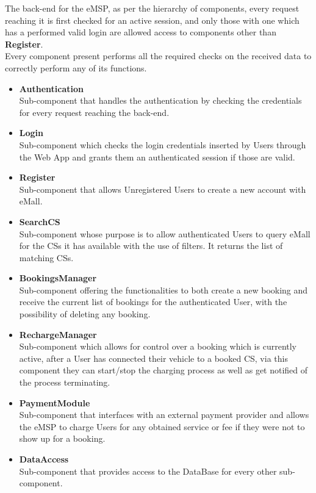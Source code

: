 \documentclass[11pt]{article}
\begin{document}
The back-end for the eMSP, as per the hierarchy of components, every request reaching it is first checked for an active session, and only those with one which has a performed valid login are allowed access to components other than \textbf{Register}. \\
Every component present performs all the required checks on the received data to correctly perform any of its functions.

\begin{itemize}
    \item \textbf{Authentication} \\
        Sub-component that handles the authentication by checking the credentials for every request reaching the back-end.
    \item \textbf{Login} \\
        Sub-component which checks the login credentials inserted by Users through the Web App and grants them an authenticated session if those are valid.
    \item \textbf{Register} \\
        Sub-component that allows Unregistered Users to create a new account with eMall.
    \item \textbf{SearchCS} \\
        Sub-component whose purpose is to allow authenticated Users to query eMall for the CSs it has available with the use of filters. It returns the list of matching CSs.
    \item \textbf{BookingsManager} \\
        Sub-component offering the functionalities to both create a new booking and receive the current list of bookings for the authenticated User, with the possibility of deleting any booking. 
    \item \textbf{RechargeManager} \\
        Sub-component which allows for control over a booking which is currently active, after a User has connected their vehicle to a booked CS, via this component they can start/stop the charging process as well as get notified of the process terminating.
    \item \textbf{PaymentModule} \\
        Sub-component that interfaces with an external payment provider and allows the eMSP to charge Users for any obtained service or fee if they were not to show up for a booking.
    \item \textbf{DataAccess} \\
        Sub-component that provides access to the DataBase for every other sub-component.
\end{itemize}
\end{document}
